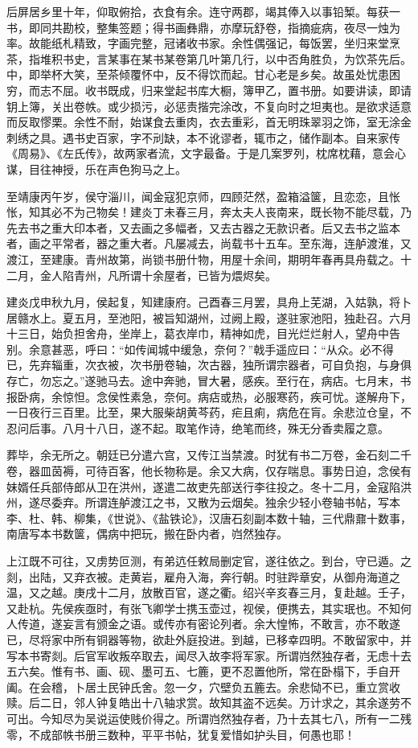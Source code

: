 \documentclass[UTF8,titlepage,oneside]{ctexbook}
\begin{document}
后屏居乡里十年，仰取俯拾，衣食有余。连守两郡，竭其俸入以事铅椠。每获一书，即同共勘校，整集签题；得书画彝鼎，亦摩玩舒卷，指摘疵病，夜尽一烛为率。故能纸札精致，字画完整，冠诸收书家。余性偶强记，每饭罢，坐归来堂烹茶，指堆积书史，言某事在某书某卷第几叶第几行，以中否角胜负，为饮茶先后。中，即举杯大笑，至茶倾覆怀中，反不得饮而起。甘心老是乡矣。故虽处忧患困穷，而志不屈。收书既成，归来堂起书库大橱，簿甲乙，置书册。如要讲读，即请钥上簿，关出卷帙。或少损污，必惩责揩完涂改，不复向时之坦夷也。是欲求适意而反取憀栗。余性不耐，始谋食去重肉，衣去重彩，首无明珠翠羽之饰，室无涂金刺绣之具。遇书史百家，字不刓缺，本不讹谬者，辄市之，储作副本。自来家传《周易》、《左氏传》，故两家者流，文字最备。于是几案罗列，枕席枕藉，意会心谋，目往神授，乐在声色狗马之上。


至靖康丙午岁，侯守淄川，闻金寇犯京师，四顾茫然，盈箱溢箧，且恋恋，且怅怅，知其必不为己物矣！建炎丁未春三月，奔太夫人丧南来，既长物不能尽载，乃先去书之重大印本者，又去画之多幅者，又去古器之无款识者。后又去书之监本者，画之平常者，器之重大者。凡屡减去，尚载书十五车。至东海，连舻渡淮，又渡江，至建康。青州故第，尚锁书册什物，用屋十余间，期明年春再具舟载之。十二月，金人陷青州，凡所谓十余屋者，已皆为煨烬矣。


建炎戊申秋九月，侯起复，知建康府。己酉春三月罢，具舟上芜湖，入姑孰，将卜居赣水上。夏五月，至池阳，被旨知湖州，过阙上殿，遂驻家池阳，独赴召。六月十三日，始负担舍舟，坐岸上，葛衣岸巾，精神如虎，目光烂烂射人，望舟中告别。余意甚恶，呼曰：“如传闻城中缓急，奈何？”戟手遥应曰：“从众。必不得已，先弃辎重，次衣被，次书册卷轴，次古器，独所谓宗器者，可自负抱，与身俱存亡，勿忘之。”遂驰马去。途中奔驰，冒大暑，感疾。至行在，病痁。七月末，书报卧病，余惊怛。念侯性素急，奈何。病痁或热，必服寒药，疾可忧。遂解舟下，一日夜行三百里。比至，果大服柴胡黄芩药，疟且痢，病危在肓。余悲泣仓皇，不忍问后事。八月十八日，遂不起。取笔作诗，绝笔而终，殊无分香卖履之意。


葬毕，余无所之。朝廷已分遣六宫，又传江当禁渡。时犹有书二万卷，金石刻二千卷，器皿茵褥，可待百客，他长物称是。余又大病，仅存喘息。事势日迫，念侯有妹婿任兵部侍郎从卫在洪州，遂遣二故吏先部送行李往投之。冬十二月，金寇陷洪州，遂尽委弃。所谓连舻渡江之书，又散为云烟矣。独余少轻小卷轴书帖，写本李、杜、韩、柳集，《世说》、《盐铁论》，汉唐石刻副本数十轴，三代鼎鼐十数事，南唐写本书数箧，偶病中把玩，搬在卧内者，岿然独存。


上江既不可往，又虏势叵测，有弟迒任敕局删定官，遂往依之。到台，守已遁。之剡，出陆，又弃衣被。走黄岩，雇舟入海，奔行朝。时驻跸章安，从御舟海道之温，又之越。庚戌十二月，放散百官，遂之衢。绍兴辛亥春三月，复赴越。壬子，又赴杭。先侯疾亟时，有张飞卿学士携玉壶过，视侯，便携去，其实珉也。不知何人传道，遂妄言有颁金之语。或传亦有密论列者。余大惶怖，不敢言，亦不敢遂已，尽将家中所有铜器等物，欲赴外庭投进。到越，已移幸四明。不敢留家中，并写本书寄剡。后官军收叛卒取去，闻尽入故李将军家。所谓岿然独存者，无虑十去五六矣。惟有书、画、砚、墨可五、七簏，更不忍置他所，常在卧榻下，手自开阖。在会稽，卜居土民钟氏舍。忽一夕，穴壁负五簏去。余悲恸不已，重立赏收赎。后二日，邻人钟复皓出十八轴求赏。故知其盗不远矣。万计求之，其余遂劳不可出。今知尽为吴说运使贱价得之。所谓岿然独存者，乃十去其七八，所有一二残零，不成部帙书册三数种，平平书帖，犹复爱惜如护头目，何愚也耶！
\end{document}

